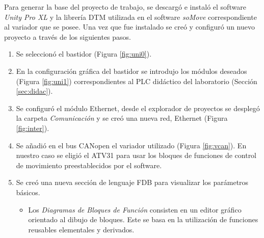 Para generar la base del proyecto de trabajo, se descargó e instaló el software \textit{Unity Pro XL} y la librería DTM utilizada en el software \textit{soMove} correspondiente al variador que se posee. Una vez que fue instalado se creó y configuró un nuevo proyecto a través de los siguientes pasos.
\begin{enumerate}
	\item Se seleccionó el bastidor (Figura \ref{fig:uni0}).
	\item En la configuración gráfica del bastidor 
se introdujo los módulos
	deseados (Figura \ref{fig:uni1}) correspondientes al PLC didáctico del laboratorio (Sección \ref{sec:didac}). 
	\item Se configuró el módulo Ethernet, desde el explorador de
	proyectos se desplegó la
	carpeta \textit{Comunicación} y se creó una nueva red, Ethernet (Figura \ref{fig:inter}).
	\item Se añadió en el bus CANopen el variador utilizado (Figura \ref{fig:vcan}). En nuestro caso se eligió el ATV31 para usar los bloques de funciones de control de movimiento preestablecidos por el software.
	\item Se creó una nueva sección de lenguaje FDB para visualizar los parámetros básicos.
	\begin{itemize}
		\item Los \textit{Diagramas de Bloques de Función} consisten en un editor gráfico orientado al dibujo
		de bloques. Este se basa en la utilización de funciones reusables elementales y
		derivados.
	\end{itemize}
\end{enumerate}
	

